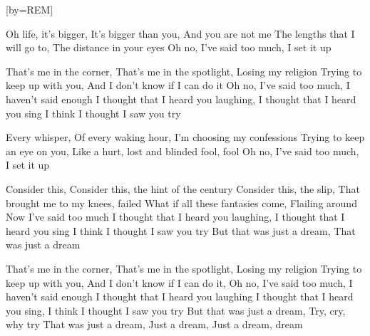 

[by=REM]

\begin{LARGE}


\beginverse
Oh life, it's bigger, It's bigger than you, And you are not me
The lengths that I will go to, The distance in your eyes
Oh no, I've said too much, I set it up
\endverse

\beginverse
That's me in the corner, That's me in the spotlight, Losing my religion
Trying to keep up with you, And I don't know if I can do it
Oh no, I've said too much, I haven't said enough
I thought that I heard you laughing, I thought that I heard you sing
I think I thought I saw you try
\endverse

\beginverse
Every whisper, Of every waking hour, I'm choosing my confessions
Trying to keep an eye on you, Like a hurt, lost and blinded fool, fool
Oh no, I've said too much, I set it up
\endverse

\beginverse
Consider this, Consider this, the hint of the century
Consider this, the slip, That brought me to my knees, failed
What if all these fantasies come, Flailing around
Now I've said too much
I thought that I heard you laughing, I thought that I heard you sing
I think I thought I saw you try
But that was just a dream, That was just a dream
\endverse

\beginverse
That's me in the corner, That's me in the spotlight, Losing my religion
Trying to keep up with you,
And I don't know if I can do it, Oh no, I've said too much, I haven't said enough
I thought that I heard you laughing
I thought that I heard you sing, I think I thought I saw you try
But that was just a dream, Try, cry, why try
That was just a dream, Just a dream, Just a dream, dream
\endverse


\end{LARGE}


\chordson
\endsong
